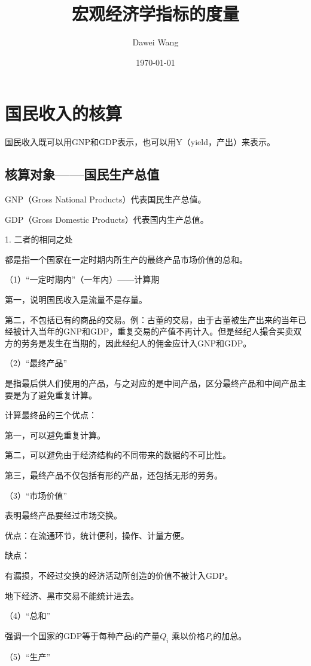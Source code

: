 \documentclass{article}
\title{宏观经济学指标的度量}
\author{Dawei Wang}
\date{\today}
\begin{document}
	\maketitle
\section{国民收入的核算}
国民收入既可以用GNP和GDP表示，也可以用Y（yield，产出）来表示。

\subsection{核算对象——国民生产总值}
GNP（Gross National Products）代表国民生产总值。

GDP（Gross Domestic Products）代表国内生产总值。

\hspace*{\fill}

1. 二者的相同之处

都是指一个国家在一定时期内所生产的最终产品市场价值的总和。

（1）“一定时期内”（一年内）——计算期

第一，说明国民收入是流量不是存量。

第二，不包括已有的商品的交易。例：古董的交易，由于古董被生产出来的当年已经被计入当年的GNP和GDP，重复交易的产值不再计入。但是经纪人撮合买卖双方的劳务是发生在当期的，因此经纪人的佣金应计入GNP和GDP。

（2）“最终产品”

是指最后供人们使用的产品，与之对应的是中间产品，区分最终产品和中间产品主要是为了避免重复计算。

计算最终品的三个优点：

第一，可以避免重复计算。

第二，可以避免由于经济结构的不同带来的数据的不可比性。

第三，最终产品不仅包括有形的产品，还包括无形的劳务。

（3）“市场价值”

表明最终产品要经过市场交换。

优点：在流通环节，统计便利，操作、计量方便。

缺点：

有漏损，不经过交换的经济活动所创造的价值不被计入GDP。

地下经济、黑市交易不能统计进去。

（4）“总和”

强调一个国家的GDP等于每种产品i的产量$ Q_i $ 乘以价格$ P_i $的加总。

（5）“生产”
\end{document}
